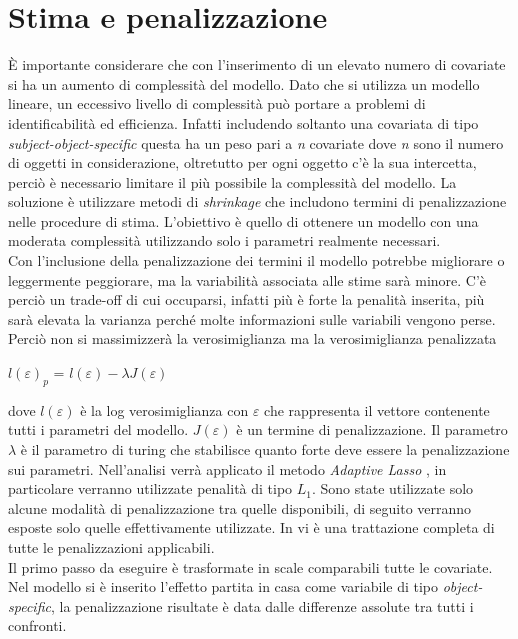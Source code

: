 \section{Stima e penalizzazione}
È importante considerare che con l'inserimento di un elevato numero di covariate si ha un aumento di complessità del modello. Dato che si utilizza un modello lineare, un eccessivo livello di complessità può portare a problemi di identificabilità ed efficienza. Infatti includendo soltanto una covariata di tipo \emph{subject-object-specific} questa ha un peso pari a \emph{n} covariate dove \emph{n} sono il numero di oggetti in considerazione, oltretutto per ogni oggetto c'è la sua intercetta, perciò è necessario limitare il più possibile la complessità del modello. La soluzione è utilizzare metodi di \emph{shrinkage} che includono termini di penalizzazione nelle procedure di stima. L'obiettivo è quello di ottenere un modello con una moderata complessità utilizzando solo i parametri realmente necessari. \\
Con l'inclusione della penalizzazione dei termini il modello potrebbe migliorare o leggermente peggiorare, ma la variabilità associata alle stime sarà minore. C'è perciò un trade-off di cui occuparsi, infatti più è forte la penalità inserita, più sarà elevata la varianza perché molte informazioni sulle variabili vengono perse. Perciò non si massimizzerà la verosimiglianza ma la verosimiglianza penalizzata 
\begin{center}
	$ l(\varepsilon)_{p}$ = $l(\varepsilon) - \lambda J(\varepsilon)$
\end{center}
dove $l(\varepsilon)$ è la log verosimiglianza con $\varepsilon$ che rappresenta il vettore contenente tutti i parametri del modello. $J(\varepsilon)$ è un termine di penalizzazione. Il parametro $\lambda$ è il parametro di turing che stabilisce quanto forte deve essere la penalizzazione sui parametri. 
Nell'analisi verrà applicato il metodo \emph{Adaptive Lasso} \autocite{Zou2006}, in particolare verranno utilizzate penalità di tipo $L_1$. Sono state utilizzate solo alcune modalità di penalizzazione tra quelle disponibili, di seguito verranno esposte solo quelle effettivamente utilizzate. In \autocite{SchaubergerTutz2019} vi è una trattazione completa di tutte le penalizzazioni applicabili.\\
Il primo passo da eseguire è trasformate in scale comparabili tutte le covariate.\\
Nel modello si è inserito l'effetto partita in casa come variabile di tipo \emph{object-specific}, la penalizzazione risultate è data dalle differenze assolute tra tutti i confronti.

